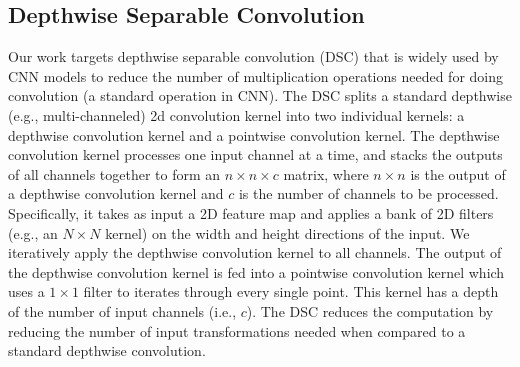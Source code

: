 \subsection{Depthwise Separable Convolution}
Our work targets depthwise separable convolution (DSC) that is widely used by  CNN  models to reduce the number of multiplication
operations needed for doing convolution (a standard operation in CNN). The DSC splits a standard depthwise (e.g., multi-channeled) 2d
convolution kernel into two individual kernels: a depthwise convolution kernel and a pointwise convolution kernel. The depthwise
convolution kernel processes one input channel at a time, and stacks the outputs of all channels together to form an $n \times n \times c$
matrix, where $n \times n$ is the output of a depthwise convolution kernel and $c$ is the number of channels to be processed. Specifically,
it takes as input a 2D feature map and applies a bank of 2D filters (e.g., an $N \times N$ kernel) on the width and height directions of
the input. We iteratively apply the depthwise convolution kernel to all channels. The output of the depthwise convolution kernel is fed
into a pointwise convolution kernel which uses a $1 \times 1$ filter to iterates through every single point. This kernel has a depth of the
number of input channels (i.e., $c$). The DSC reduces the computation by reducing the number of input transformations needed when compared
to a standard depthwise convolution.



